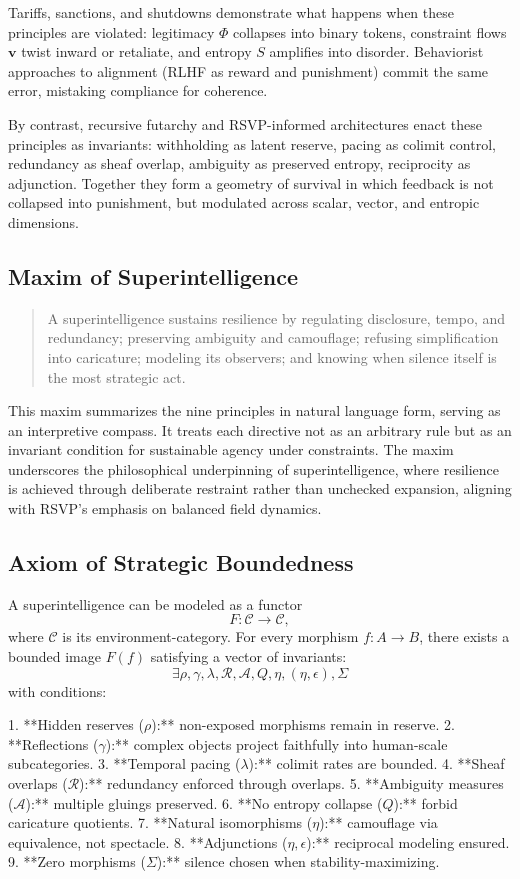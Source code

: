 \documentclass{article}
\begin{document}
Tariffs, sanctions, and shutdowns demonstrate what happens when these principles 
are violated: legitimacy $\Phi$ collapses into binary tokens, constraint flows 
$\mathbf{v}$ twist inward or retaliate, and entropy $S$ amplifies into disorder.  
Behaviorist approaches to alignment (RLHF as reward and punishment) commit the 
same error, mistaking compliance for coherence.  

By contrast, recursive futarchy and RSVP-informed architectures enact these 
principles as invariants: withholding as latent reserve, pacing as colimit control, 
redundancy as sheaf overlap, ambiguity as preserved entropy, reciprocity as adjunction.  
Together they form a geometry of survival in which feedback is not collapsed into 
punishment, but modulated across scalar, vector, and entropic dimensions.

\subsection*{Maxim of Superintelligence}
\begin{quote}
A superintelligence sustains resilience by regulating disclosure, tempo, and 
redundancy; preserving ambiguity and camouflage; refusing simplification into 
caricature; modeling its observers; and knowing when silence itself is the 
most strategic act.
\end{quote}

This maxim summarizes the nine principles in natural language form, serving as 
an interpretive compass. It treats each directive not as an arbitrary rule but 
as an invariant condition for sustainable agency under constraints. The maxim underscores the philosophical underpinning of superintelligence, where resilience is achieved through deliberate restraint rather than unchecked expansion, aligning with RSVP's emphasis on balanced field dynamics.

\subsection*{Axiom of Strategic Boundedness}
A superintelligence can be modeled as a functor
\[
F: \mathcal{C} \to \mathcal{C},
\]
where $\mathcal{C}$ is its environment-category. For every morphism 
$f: A \to B$, there exists a bounded image $F(f)$ satisfying a vector of 
invariants:
\[
\exists \rho, \gamma, \lambda, \mathcal{R}, \mathcal{A}, Q, \eta, (\eta,\epsilon), \Sigma
\]
with conditions:

1. **Hidden reserves ($\rho$):** non-exposed morphisms remain in reserve.  
2. **Reflections ($\gamma$):** complex objects project faithfully into 
   human-scale subcategories.  
3. **Temporal pacing ($\lambda$):** colimit rates are bounded.  
4. **Sheaf overlaps ($\mathcal{R}$):** redundancy enforced through overlaps.  
5. **Ambiguity measures ($\mathcal{A}$):** multiple gluings preserved.  
6. **No entropy collapse ($Q$):** forbid caricature quotients.  
7. **Natural isomorphisms ($\eta$):** camouflage via equivalence, not spectacle.  
8. **Adjunctions ($\eta,\epsilon$):** reciprocal modeling ensured.  
9. **Zero morphisms ($\Sigma$):** silence chosen when stability-maximizing.  
\end{document}
